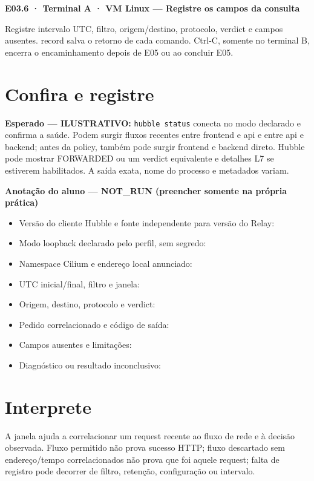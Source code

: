 \documentclass[12pt,openany,oneside,a4paper,chapter=TITLE,english,brazil]{abntex2}
\providecommand{\tightlist}{\setlength{\itemsep}{0pt}\setlength{\parskip}{0pt}}
\begin{document}
\textbf{E03.6 · Terminal A · VM Linux --- Registre os campos da consulta}

Registre intervalo UTC, filtro, origem/destino, protocolo, verdict e campos ausentes. record salva o retorno de cada comando. Ctrl-C, somente no terminal B, encerra o encaminhamento depois de E05 ou ao concluir E05.

\section*{Confira e registre}\label{confira-e-registre-2}

\textbf{Esperado --- ILUSTRATIVO:} \texttt{hubble status} conecta no modo declarado e confirma a saúde. Podem surgir fluxos recentes entre frontend e api e entre api e backend; antes da policy, também pode surgir frontend e backend direto. Hubble pode mostrar FORWARDED ou um verdict equivalente e detalhes L7 se estiverem habilitados. A saída exata, nome do processo e metadados variam.

\textbf{Anotação do aluno --- NOT\_RUN (preencher somente na própria prática)}

\begin{itemize}
\tightlist
\item
  Versão do cliente Hubble e fonte independente para versão do Relay: \hrulefill
\item
  Modo loopback declarado pelo perfil, sem segredo: \hrulefill
\item
  Namespace Cilium e endereço local anunciado: \hrulefill
\item
  UTC inicial/final, filtro e janela: \hrulefill
\item
  Origem, destino, protocolo e verdict: \hrulefill
\item
  Pedido correlacionado e código de saída: \hrulefill
\item
  Campos ausentes e limitações: \hrulefill
\item
  Diagnóstico ou resultado inconclusivo: \hrulefill
\end{itemize}

\section*{Interprete}\label{interprete-2}

A janela ajuda a correlacionar um request recente ao fluxo de rede e à decisão observada. Fluxo permitido não prova sucesso HTTP; fluxo descartado sem endereço/tempo correlacionados não prova que foi aquele request; falta de registro pode decorrer de filtro, retenção, configuração ou intervalo.
\end{document}
